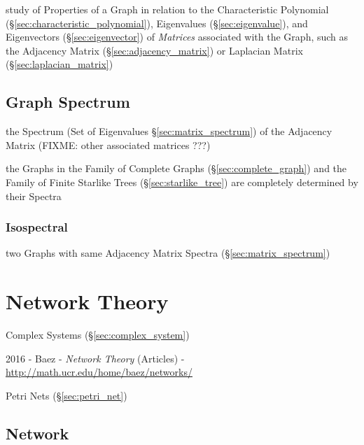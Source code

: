 study of Properties of a Graph in relation to the Characteristic Polynomial
(\S\ref{sec:characteristic_polynomial}), Eigenvalues (\S\ref{sec:eigenvalue}),
and Eigenvectors (\S\ref{sec:eigenvector}) of \emph{Matrices} associated with
the Graph, such as the Adjacency Matrix (\S\ref{sec:adjacency_matrix}) or
Laplacian Matrix (\S\ref{sec:laplacian_matrix})



\subsection{Graph Spectrum}\label{sec:graph_spectrum}

the Spectrum (Set of Eigenvalues \S\ref{sec:matrix_spectrum}) of the Adjacency
Matrix (FIXME: other associated matrices ???)

the Graphs in the Family of Complete Graphs (\S\ref{sec:complete_graph}) and
the Family of Finite Starlike Trees (\S\ref{sec:starlike_tree}) are completely
determined by their Spectra



\subsubsection{Isospectral}\label{sec:isospectrum}

two Graphs with same Adjacency Matrix Spectra (\S\ref{sec:matrix_spectrum})



\section{Network Theory}\label{sec:network_theory}

Complex Systems (\S\ref{sec:complex_system})

2016 - Baez - \emph{Network Theory} (Articles) -
\url{http://math.ucr.edu/home/baez/networks/}

Petri Nets (\S\ref{sec:petri_net})



\subsection{Network}\label{sec:network}

